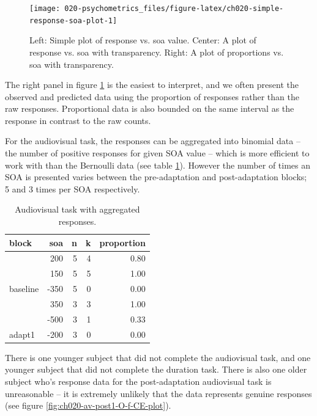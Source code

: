 \documentclass[11pt, oneside, openany]{scrbook}
\begin{document}
\begin{figure}

{\centering \texttt{[image: 020-psychometrics\_files/figure-latex/ch020-simple-response-soa-plot-1]} 

}

\caption{Left: Simple plot of response vs. soa value. Center: A plot of response vs. soa with transparency. Right: A plot of proportions vs. soa with transparency.}\label{fig:ch020-simple-response-soa-plot}
\end{figure}

The right panel in figure \ref{fig:ch020-simple-response-soa-plot} is the easiest to interpret, and we often present the observed and predicted data using the proportion of responses rather than the raw responses. Proportional data is also bounded on the same interval as the response in contrast to the raw counts.

For the audiovisual task, the responses can be aggregated into binomial data -- the number of positive responses for given SOA value -- which is more efficient to work with than the Bernoulli data (see table \ref{tab:ch020-av-bin-sample}). However the number of times an SOA is presented varies between the pre-adaptation and post-adaptation blocks; 5 and 3 times per SOA respectively.

\begin{table}[!h]

\caption{\label{tab:ch020-av-bin-sample}Audiovisual task with aggregated responses.}
\centering
\begin{tabular}[t]{lrrrr}
\toprule
block & soa & n & k & proportion\\
\midrule
 & 200 & 5 & 4 & 0.80\\
\cmidrule{2-5}
 & 150 & 5 & 5 & 1.00\\
\cmidrule{2-5}
\multirow[t]{-3}{*}{\raggedright\arraybackslash baseline} & -350 & 5 & 0 & 0.00\\
\cmidrule{1-5}
 & 350 & 3 & 3 & 1.00\\
\cmidrule{2-5}
 & -500 & 3 & 1 & 0.33\\
\cmidrule{2-5}
\multirow[t]{-3}{*}{\raggedright\arraybackslash adapt1} & -200 & 3 & 0 & 0.00\\
\bottomrule
\end{tabular}
\end{table}

There is one younger subject that did not complete the audiovisual task, and one younger subject that did not complete the duration task. There is also one older subject who's response data for the post-adaptation audiovisual task is unreasonable -- it is extremely unlikely that the data represents genuine responses (see figure \ref{fig:ch020-av-post1-O-f-CE-plot}).
\end{document}
